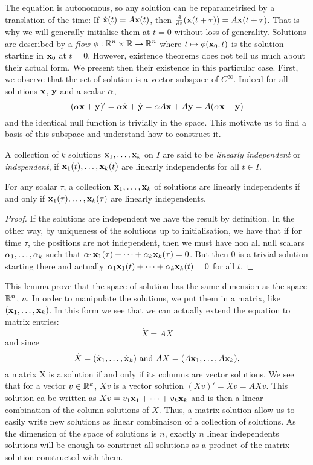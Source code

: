 The equation is autonomous, so any solution can be reparametrised by a translation of the time:
If $\dot{\mathbf{x}}(t)=A\mathbf{x}(t)$, then $\frac{\mathrm{d}}{\mathrm{d} t}(\mathbf{x}(t+\tau))=A\mathbf{x}(t+\tau)$. That is why we will generally initialise them at $t=0$ without loss of generality. Solutions are described by a \emph{flow} $\phi:\mathbb{R}^n\times \mathbb{R}\to\mathbb{R}^n$ where $t\mapsto\phi(\mathbf{x}_0,t)$ is the solution starting in $\mathbf{x}_0$ at $t=0$. However, existence theorems does not tell us much about their actual form. We present then their existence in this particular case.
First, we observe that the set of solution is a vector subspace of $C^\infty$. Indeed for all solutions $\mathbf{x}$, $\mathbf{y}$ and a scalar $\alpha$, \[(\alpha\mathbf{x}+\mathbf{y})'=\alpha\dot{\mathbf{x}} + \dot{\mathbf{y}}=\alpha A\mathbf{x} + A\mathbf{y}=A(\alpha\mathbf{x}+\mathbf{y})\] and the identical null function is trivially in the space. This motivate us to find a basis of this subspace and understand how to construct it.
\begin{definition}
    A collection of $k$ solutions $\mathbf{x}_1,\dots,\mathbf{x}_k$ on $I$ are said to be \emph{linearly independent} or \emph{independent}, if $\mathbf{x}_1(t),\dots,\mathbf{x}_k(t)$ are linearly independents for all $t\in I$.
\end{definition}
\begin{lemme} \label{lem:indépendance}
For any scalar $\tau$, a collection $\mathbf{x}_1,\dots,\mathbf{x}_k$ of solutions are linearly independents if and only if $\mathbf{x}_1(\tau),\dots,\mathbf{x}_k(\tau)$ are linearly independents.
\end{lemme}
\begin{proof}
If the solutions are independent we have the result by definition. In the other way, by uniqueness of the solutions up to initialisation, we have that if for time $\tau$, the positions are not independent, then we must have non all null scalars $\alpha_1,\dots,\alpha_k$ such that  $\alpha_1\mathbf{x}_1(\tau) + \dots + \alpha_k\mathbf{x}_k(\tau)=0$. But then 0 is a trivial solution starting there and actually  $\alpha_1\mathbf{x}_1(t) + \dots + \alpha_k\mathbf{x}_k(t)=0$ for all $t$.
\end{proof}
This lemma prove that the space of solution has the same dimension as the space $\mathbb{R}^n$, \ie $n$. 
In order to manipulate the solutions, we put them in a matrix, like $(\mathbf{x}_1,\dots,\mathbf{x}_k)$. In this form we see that we can actually extend the equation to matrix entries: 
\[\dot{X}=AX\]
and since 
\[\dot{X}=(\dot{\mathbf{x}}_1,\dots,\dot{\mathbf{x}}_k)  
\text{ and } 
AX=(A\mathbf{x}_1,\dots,A\mathbf{x}_k),\]
a matrix X is a solution if and only if its columns are vector solutions. We see that for a vector $v\in\mathbb{R}^k$, $Xv$ is a vector solution $(Xv)' = \dot{X}v = AXv$. This solution ca be written as $Xv = v_1\mathbf{x}_1 + \dots + v_k\mathbf{x}_k$ and is then a linear combination of the column solutions of $X$. Thus, a matrix solution allow us to easily write new solutions as linear combinaison of a collection of solutions. As the dimension of the space of solutions is $n$, exactly $n$ linear independents solutions will be enough to construct all solutions as a product of the matrix solution constructed with them.
